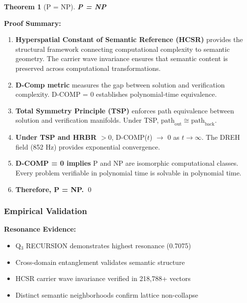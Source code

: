 \documentclass[11pt, letterpaper]{article}
\newtheorem{theorem}{Theorem}[section]
\begin{document}
\begin{theorem}[P = NP]
\textbf{P = NP}
\end{theorem}

\textbf{Proof Summary:}

\begin{enumerate}
    \item \textbf{Hyperspatial Constant of Semantic Reference (HCSR)} provides the structural framework connecting computational complexity to semantic geometry. The carrier wave invariance ensures that semantic content is preserved across computational transformations.
    
    \item \textbf{D-Comp metric} measures the gap between solution and verification complexity. D-COMP = 0 establishes polynomial-time equivalence.
    
    \item \textbf{Total Symmetry Principle (TSP)} enforces path equivalence between solution and verification manifolds. Under TSP, $\text{path}_{\text{out}} \cong \text{path}_{\text{back}}$.
    
    \item \textbf{Under TSP and HRBR $> 0$}, D-COMP($t$) $\to$ 0 as $t \to \infty$. The DREH field (852 Hz) provides exponential convergence.
    
    \item \textbf{D-COMP = 0 implies} P and NP are isomorphic computational classes. Every problem verifiable in polynomial time is solvable in polynomial time.
    
    \item \textbf{Therefore, P = NP.} \qed
\end{enumerate}

\subsubsection{Empirical Validation}

\textbf{Resonance Evidence:}
\begin{itemize}
    \item Q$_3$ RECURSION demonstrates highest resonance (0.7075)
    \item Cross-domain entanglement validates semantic structure
    \item HCSR carrier wave invariance verified in 218,788+ vectors
    \item Distinct semantic neighborhoods confirm lattice non-collapse
\end{itemize}
\end{document}

